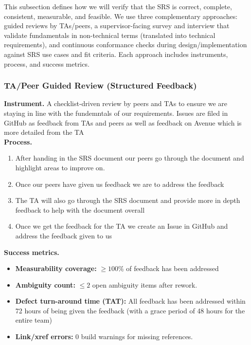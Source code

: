 \documentclass[12pt, titlepage]{article}
\begin{document}
This subsection defines how we will verify that the SRS is correct, complete, consistent, measurable, and feasible. We use three complementary approaches: guided reviews by TAs/peers, a supervisor-facing survey and interview that validate fundamentals in non-technical terms (translated into technical requirements), and continuous conformance checks during design/implementation against SRS use cases and fit criteria. Each approach includes instruments, process, and success metrics.

\subsubsection*{TA/Peer Guided Review (Structured Feedback)}
\textbf{Instrument.} A checklist-driven review by peers and TAs to ensure we are staying in line with the fundemntals of our requirements. Issues are filed in GitHub as feedback from TAs and peers as well as feedback on Avenue which is more detailed from the TA\\
\textbf{Process.}
\begin{enumerate}
  \item After handing in the SRS document our peers go through the document and highlight areas to improve on.
  \item Once our peers have given us feedback we are to address the feedback
  \item The TA will also go through the SRS document and provide more in depth feedback to help with the document overall
  \item Once we get the feedback for the TA we create an Issue in GitHub and address the feedback given to us
\end{enumerate}
\textbf{Success metrics.}
\begin{itemize}
  \item \textbf{Measurability coverage:} $\geq 100\%$ of feedback has been addressed
  \item \textbf{Ambiguity count:} \(\leq 2\) open ambiguity items after rework.
  \item \textbf{Defect turn-around time (TAT):} All feedback has been addressed within 72 hours of being given the feedback (with a grace period of 48 hours for the entire team)
  \item \textbf{Link/xref errors:} $0$ build warnings for missing references.
\end{itemize}
\end{document}
